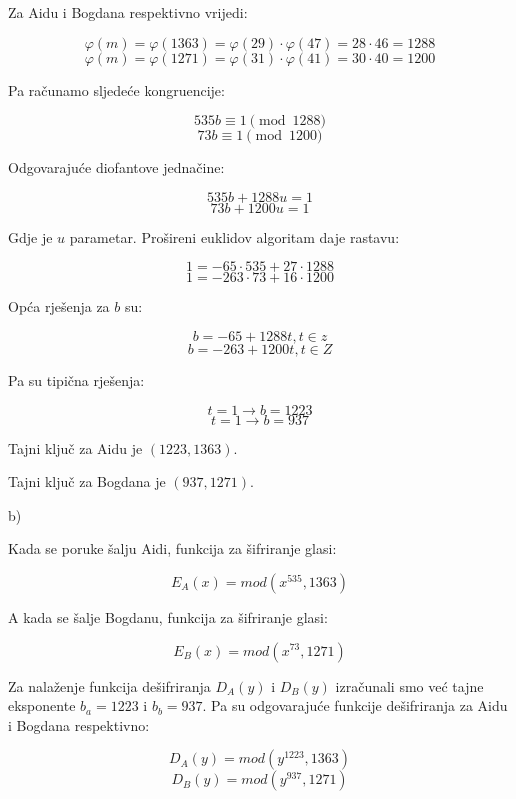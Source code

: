 \documentclass[12pt]{article}
\begin{document}
Za Aidu i Bogdana respektivno vrijedi:

$$\varphi(m) = \varphi(1363) = \varphi(29) \cdot \varphi(47) = 28 \cdot 46 = 1288$$
$$\varphi(m) = \varphi(1271) = \varphi(31) \cdot \varphi(41) = 30 \cdot 40 = 1200$$\vspace{1mm}

Pa računamo sljedeće kongruencije:

$$535b \equiv 1 \pmod{1288}$$
$$73b \equiv 1 \pmod{1200}$$\vspace{1mm}

Odgovarajuće diofantove jednačine:

$$535b + 1288u = 1$$
$$73b + 1200u = 1$$\vspace{1mm}

Gdje je $u$ parametar. Prošireni euklidov algoritam daje rastavu:

$$1 = -65 \cdot 535 + 27 \cdot 1288$$
$$1 = -263 \cdot 73 + 16 \cdot 1200$$\vspace{1mm}

Opća rješenja za $b$ su:

$$b = -65 + 1288t, t \in z$$
$$b = -263 + 1200t, t \in Z$$\vspace{1mm}

Pa su tipična rješenja:

$$t = 1 \to b = 1223$$
$$t = 1 \to b = 937$$\vspace{1mm}

Tajni ključ za Aidu je $(1223, 1363)$.

Tajni ključ za Bogdana je $(937, 1271)$.\vspace{1mm}

b)\vspace{1mm}

Kada se poruke šalju Aidi, funkcija za šifriranje glasi:

$$E_{A}(x) = mod(x^{535}, 1363)$$\vspace{1mm}

A kada se šalje Bogdanu, funkcija za šifriranje glasi:

$$E_{B}(x) = mod(x^{73}, 1271)$$\vspace{1mm}

Za nalaženje funkcija dešifriranja $D_{A}(y)$ i $D_{B}(y)$ izračunali smo već tajne eksponente $b_{a} = 1223$ i $b_{b} = 937$. Pa su odgovarajuće funkcije dešifriranja za Aidu i Bogdana respektivno:

$$D_{A}(y) = mod(y^{1223}, 1363)$$
$$D_{B}(y) = mod(y^{937}, 1271)$$\vspace{1mm}
\end{document}
